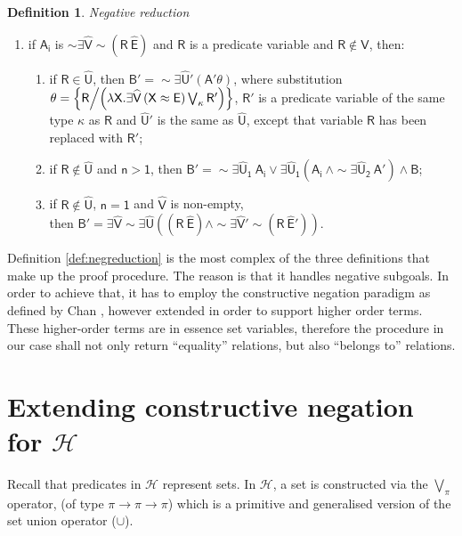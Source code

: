 \documentclass[inscr,ack,preface]{dithesis}
\theoremstyle{definition}
\newtheorem{definition}{Definition}[]
\newcommand{\h}{$\mathcal{H}$}
\newcommand{\msf}[1]{$\mathsf{#1}$}
\begin{document}
\begin{definition}{\emph{Negative reduction}}
\begin{enumerate}
  \item if \msf{A_i} is \msf{\sim \exists \widehat{V} \sim \left( R ~ \widehat{E} \right)} and \msf{R} is a predicate variable and \msf{R \not\in \widehat{V}}, then:
        \begin{enumerate}
          \item if \msf{R \in \widehat{U}},
                then \msf{B' = \sim \exists \widehat{U}' \left( A' \theta \right)},
                where substitution \\ \msf{\theta = \left\{ R \middle/ \left( \lambda X . \exists \widehat{V} \left( X \approx E \right) \bigvee_{\kappa} R' \right) \right\}},
                \msf{R'} is a predicate variable of the same type \msf{\kappa} as \msf{R} and \msf{\widehat{U}'} is the same as \msf{\widehat{U}}, except that variable \msf{R} has been replaced with \msf{R'};
          \item if \msf{R \not\in \widehat{U}} and \msf{n > 1},
                then \msf{B' = \sim \exists \widehat{U}_1 ~ A_i \lor \exists \widehat{U}_1 \left( A_i ~ \land \sim \exists \widehat{U}_2 ~ A' \right) \land B};
          \item if \msf{R \not\in \widehat{U}}, \msf{n = 1} and \msf{\widehat{V}} is non-empty, \\
                then \msf{B' = \exists \widehat{V} \sim \exists \widehat{U} \left( \left( R ~ \widehat{E} \right) \land \sim \exists \widehat{V}' \sim \left( R ~ \widehat{E}' \right) \right)}.
        \end{enumerate}
\end{enumerate}

Definition \ref{def:negreduction} is the most complex of the three definitions that make up the proof procedure. The reason is that it handles negative subgoals. In order to achieve that, it has to employ the constructive negation paradigm as defined by Chan \cite{DBLP:conf/slp/Chan89}, however extended in order to support higher order terms. These higher-order terms are in essence set variables, therefore the procedure in our case shall not only return ``equality'' relations, but also ``belongs to'' relations.
\end{definition}

\section{Extending constructive negation for \h{}}
Recall that predicates in \h{} represent sets. In \h{}, a set is constructed via the $\bigvee_{\pi}$ operator, (of type $\pi \rightarrow \pi \rightarrow \pi$) which is a primitive and generalised version of the set union operator ($\cup$).
\end{document}
